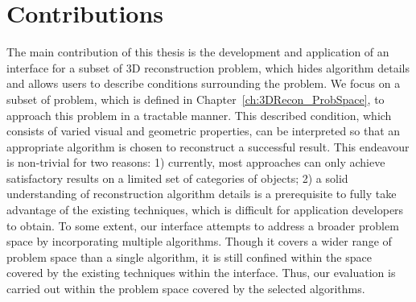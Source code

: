 \section{Contributions}
The main contribution of this thesis is the development and application of an interface for a subset of 3D reconstruction problem, which hides algorithm details and allows users to describe conditions surrounding the problem. We focus on a subset of problem, which is defined in Chapter~\ref{ch:3DRecon_ProbSpace}, to approach this problem in a tractable manner. This described condition, which consists of varied visual and geometric properties, can be interpreted so that an appropriate algorithm is chosen to reconstruct a successful result. This endeavour is non-trivial for two reasons: 1) currently, most approaches can only achieve satisfactory results on a limited set of categories of objects; 2) a solid understanding of reconstruction algorithm details is a prerequisite to fully take advantage of the existing techniques, which is difficult for application developers to obtain. To some extent, our interface attempts to address a broader problem space by incorporating multiple algorithms. Though it covers a wider range of problem space than a single algorithm, it is still confined within the space covered by the existing techniques within the interface. Thus, our evaluation is carried out within the problem space covered by the selected algorithms.



